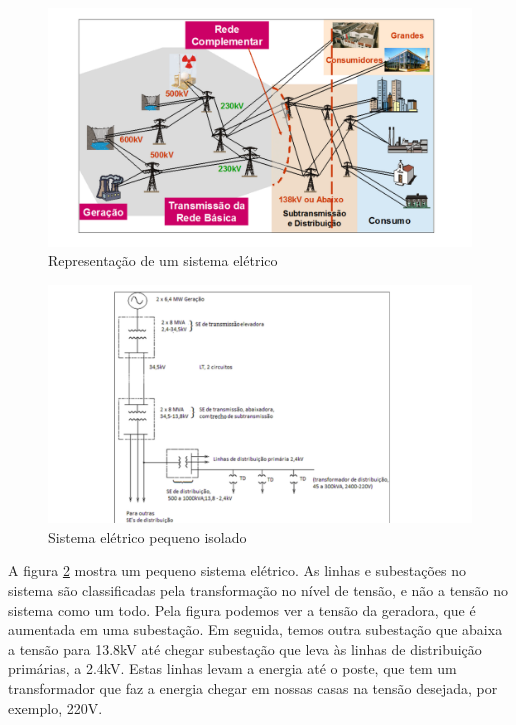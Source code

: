 \begin{figure}[h]
\begin{centering}
\includegraphics[scale=0.5]{anexos/figsist}
\par\end{centering}

\caption{\label{fig:sist}Representação de um sistema elétrico}
\end{figure}

\begin{figure}[h]
\begin{centering}
\includegraphics[scale=0.5]{anexos/figrede}
\par\end{centering}

\caption{\label{fig:rede}Sistema elétrico pequeno isolado}
\end{figure}

A figura \ref{fig:rede} mostra um pequeno sistema elétrico. As linhas e subestações no sistema são classificadas pela transformação no nível de tensão, e não a tensão no sistema como um todo. Pela figura podemos ver a tensão da geradora, que é aumentada em uma subestação. Em seguida, temos outra subestação que abaixa a tensão para 13.8kV até chegar subestação que leva às linhas de distribuição primárias, a 2.4kV. Estas linhas levam a energia até o poste, que tem um transformador que faz a energia chegar em nossas casas na tensão desejada, por exemplo, 220V. 

